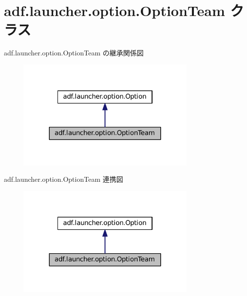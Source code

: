 \hypertarget{classadf_1_1launcher_1_1option_1_1OptionTeam}{}\section{adf.\+launcher.\+option.\+Option\+Team クラス}
\label{classadf_1_1launcher_1_1option_1_1OptionTeam}


adf.\+launcher.\+option.\+Option\+Team の継承関係図
\nopagebreak
\begin{figure}[H]
\begin{center}
\leavevmode
\includegraphics[width=251pt]{classadf_1_1launcher_1_1option_1_1OptionTeam__inherit__graph}
\end{center}
\end{figure}


adf.\+launcher.\+option.\+Option\+Team 連携図
\nopagebreak
\begin{figure}[H]
\begin{center}
\leavevmode
\includegraphics[width=251pt]{classadf_1_1launcher_1_1option_1_1OptionTeam__coll__graph}
\end{center}
\end{figure}

